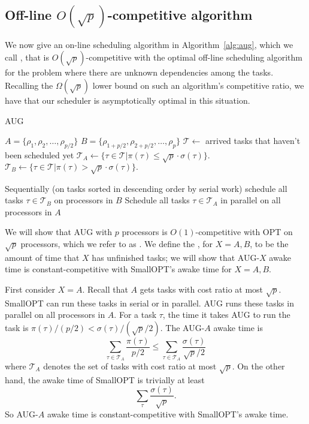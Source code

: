 \subsection{Off-line $O(\sqrt{p})$-competitive algorithm}
We now give an on-line scheduling algorithm in
Algorithm~\ref{alg:aug}, which we call , that is
$O(\sqrt{p})$-competitive with the optimal off-line scheduling
algorithm for the problem where there are unknown dependencies
among the tasks.
Recalling the $\Omega(\sqrt{p})$ lower bound on such an
algorithm's competitive ratio, we have that our scheduler is
asymptotically optimal in this situation.

\begin{algorithm}
  \caption{AUG}
  \label{alg:aug}
  \begin{algorithmic}
    \State $A = \{\rho_1, \rho_2, \ldots, \rho_{p/2} \}$
    \State $B = \{\rho_{1+p/2}, \rho_{2+p/2}, \ldots, \rho_{p} \}$
    \State
    \State $\mathcal{T} \gets$ arrived tasks that haven't been scheduled yet
    \State $\mathcal{T}_A \gets \{ \tau \in \mathcal{T} | \pi(\tau) \le \sqrt{p} \cdot \sigma(\tau) \}.$
    \State $\mathcal{T}_B \gets \{ \tau\in \mathcal{T}  | \pi(\tau) > \sqrt{p} \cdot \sigma(\tau) \}.$
    \State
    
    \State Sequentially (on tasks sorted in descending order by
    serial work) schedule all tasks $\tau \in \mathcal{T}_B$ on
    processors in $B$
    \EndIf
    \State Schedule all tasks $\tau \in \mathcal{T}_A$ in parallel on all processors in $A$

  \end{algorithmic}
\end{algorithm}

We will show that AUG with $p$ processors is $O(1)$-competitive
with OPT on $\sqrt{p}$ processors, which we refer to as
. We define the , for $X=A,B$, to be the amount of time that $X$ has
unfinished tasks; we will show that AUG-$X$ awake time is
constant-competitive with SmallOPT's awake time for $X=A,B$.

First consider $X=A$. Recall that $A$ gets tasks with cost ratio
at most $\sqrt{p}$. SmallOPT can run these tasks in serial or in
parallel. AUG runs these tasks in parallel on all processors in
$A$. For a task $\tau$, the time it takes AUG to run the task is
$\pi(\tau)/(p/2) < \sigma(\tau)/ (\sqrt{p}/2)$. The AUG-$A$ awake
time is 
$$\sum_{\tau \in \mathcal{T}_A} \frac{\pi(\tau)}{p/2} \le \sum_{\tau \in \mathcal{T}_A} \frac{\sigma(\tau)}{\sqrt{p}/2}$$
where $\mathcal{T}_A$ denotes the set of tasks with cost ratio at most $\sqrt{p}$.
On the other hand, the awake time of SmallOPT is trivially at least 
$$\sum_{\tau} \frac{\sigma(\tau)}{\sqrt{p}}.$$
So AUG-$A$ awake time is constant-competitive with SmallOPT's awake time.

